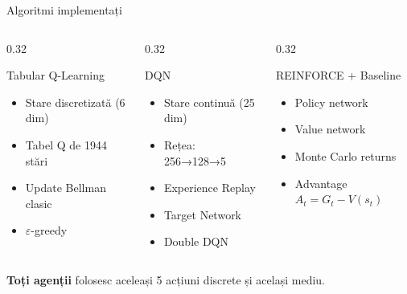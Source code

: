 \documentclass[aspectratio=169]{beamer}
\begin{document}
\begin{frame}{Algoritmi implementați}
  \begin{columns}[T]
    \begin{column}{0.32\textwidth}
      \begin{block}{\centering Tabular Q-Learning}
        \begin{itemize}
          \item Stare discretizată (6 dim)
          \item Tabel Q de 1944 stări
          \item Update Bellman clasic
          \item $\varepsilon$-greedy
        \end{itemize}
      \end{block}
    \end{column}
    
    \begin{column}{0.32\textwidth}
      \begin{block}{\centering DQN}
        \begin{itemize}
          \item Stare continuă (25 dim)
          \item Rețea: 256→128→5
          \item Experience Replay
          \item Target Network
          \item Double DQN
        \end{itemize}
      \end{block}
    \end{column}
    
    \begin{column}{0.32\textwidth}
      \begin{block}{\centering REINFORCE + Baseline}
        \begin{itemize}
          \item Policy network
          \item Value network
          \item Monte Carlo returns
          \item Advantage $A_t = G_t - V(s_t)$
        \end{itemize}
      \end{block}
    \end{column}
  \end{columns}
  
  \vspace{0.5cm}
  \centering
  \textbf{Toți agenții} folosesc aceleași 5 acțiuni discrete și același mediu.
\end{frame}
\end{document}
